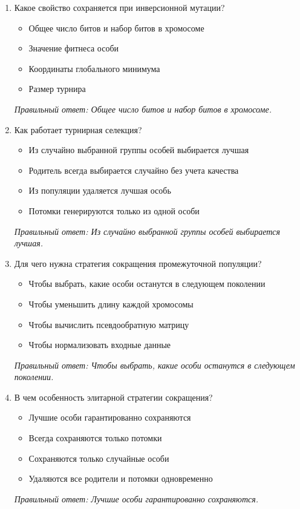 \begin{enumerate}[label=\textbf{\arabic*.}, leftmargin=0pt, itemsep=1.2em]
\item Какое свойство сохраняется при инверсионной мутации?
\begin{itemize}[label=$\square$, leftmargin=1.5cm, itemsep=0.2em, topsep=0.3em]
\item Общее число битов и набор битов в хромосоме
\item Значение фитнеса особи
\item Координаты глобального минимума
\item Размер турнира
\end{itemize}
{\small\textit{Правильный ответ: Общее число битов и набор битов в хромосоме.}}

\item Как работает турнирная селекция?
\begin{itemize}[label=$\square$, leftmargin=1.5cm, itemsep=0.2em, topsep=0.3em]
\item Из случайно выбранной группы особей выбирается лучшая
\item Родитель всегда выбирается случайно без учета качества
\item Из популяции удаляется лучшая особь
\item Потомки генерируются только из одной особи
\end{itemize}
{\small\textit{Правильный ответ: Из случайно выбранной группы особей выбирается лучшая.}}

\item Для чего нужна стратегия сокращения промежуточной популяции?
\begin{itemize}[label=$\square$, leftmargin=1.5cm, itemsep=0.2em, topsep=0.3em]
\item Чтобы выбрать, какие особи останутся в следующем поколении
\item Чтобы уменьшить длину каждой хромосомы
\item Чтобы вычислить псевдообратную матрицу
\item Чтобы нормализовать входные данные
\end{itemize}
{\small\textit{Правильный ответ: Чтобы выбрать, какие особи останутся в следующем поколении.}}

\item В чем особенность элитарной стратегии сокращения?
\begin{itemize}[label=$\square$, leftmargin=1.5cm, itemsep=0.2em, topsep=0.3em]
\item Лучшие особи гарантированно сохраняются
\item Всегда сохраняются только потомки
\item Сохраняются только случайные особи
\item Удаляются все родители и потомки одновременно
\end{itemize}
{\small\textit{Правильный ответ: Лучшие особи гарантированно сохраняются.}}


\end{enumerate}
